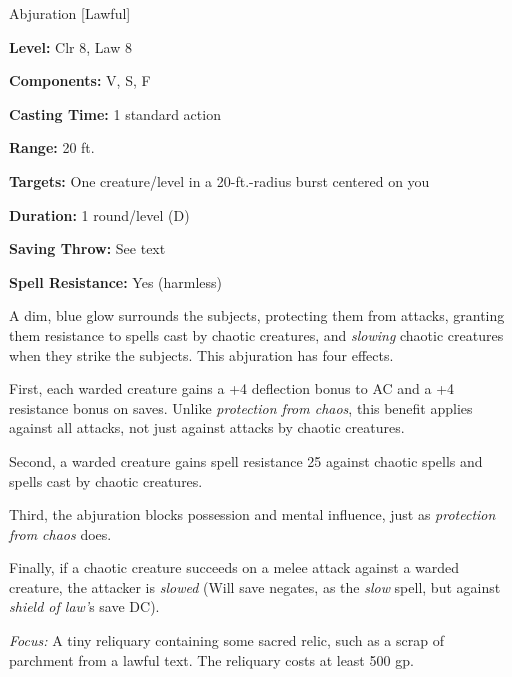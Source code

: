 
Abjuration [Lawful]

\textbf{Level:} Clr 8, Law 8

\textbf{Components:} V, S, F

\textbf{Casting Time:} 1 standard action

\textbf{Range:} 20 ft.

\textbf{Targets:} One creature/level in a 20-ft.-radius burst centered on you

\textbf{Duration:} 1 round/level (D)

\textbf{Saving Throw:} See text

\textbf{Spell Resistance:} Yes (harmless)

A dim, blue glow surrounds the subjects, protecting them from attacks, granting 
them resistance to spells cast by chaotic creatures, and \textit{slowing} chaotic 
creatures when they strike the subjects. This abjuration has four effects.

First, each warded creature gains a +4 deflection bonus to AC and a +4 resistance 
bonus on saves. Unlike \textit{protection from chaos}, this benefit applies against 
all attacks, not just against attacks by chaotic creatures.

Second, a warded creature gains spell resistance 25 against chaotic spells and 
spells cast by chaotic creatures.

Third, the abjuration blocks possession and mental influence, just as \textit{protection 
from chaos} does.

Finally, if a chaotic creature succeeds on a melee attack against a warded creature, 
the attacker is \textit{slowed} (Will save negates, as the \textit{slow} spell, 
but against \textit{shield of law'}s save DC).

\textit{Focus:} A tiny reliquary containing some sacred relic, such as a scrap 
of parchment from a lawful text. The reliquary costs at least 500 gp.

